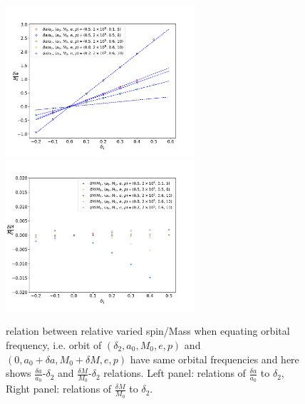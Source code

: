 \documentclass{article}
\begin{document}
\begin{figure}[!ht]
	\centering
	\includegraphics[width=7cm]{d2_spin_linear.pdf}
	\includegraphics[width=7cm]{d2_M.pdf}
	\caption{relation between relative varied spin/Mass when equating orbital frequency, i.e. orbit of $(\delta_2, a_0, M_0,e,p)$ and $(0,a_0+\delta a, M_0+\delta M,e,p)$ have same orbital frequencies and here shows $\frac{\delta a}{a_0}$-$\delta_2$ and $\frac{\delta M}{M_0}$-$\delta_2$ relations. Left panel: relations of $\frac{\delta a}{a_0}$ to $\delta_2$, Right panel: relations of $\frac{\delta M}{M_0}$ to $\delta_2$.}
	\label{d2_linear}
\end{figure}
\end{document}
